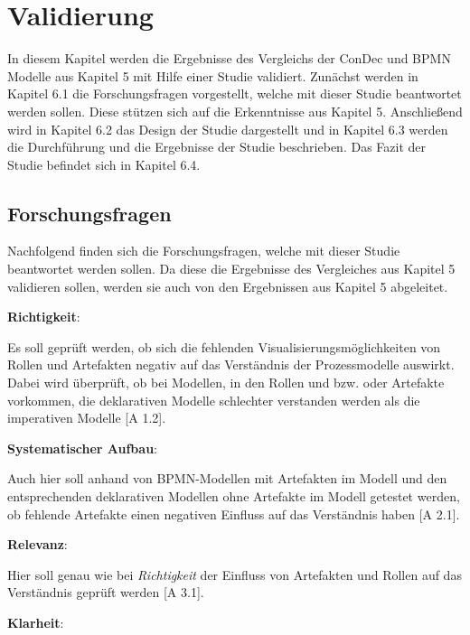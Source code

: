 \chapter{Validierung}\label{sec:chapter7}

In diesem Kapitel werden die Ergebnisse des Vergleichs der ConDec und BPMN Modelle aus Kapitel 5 mit Hilfe einer Studie validiert. Zunächst werden in Kapitel 6.1 die Forschungsfragen vorgestellt, welche mit dieser Studie beantwortet werden sollen. Diese stützen sich auf die Erkenntnisse aus Kapitel 5. Anschließend wird in Kapitel 6.2 das Design der Studie dargestellt und in Kapitel 6.3 werden die Durchführung und die Ergebnisse der Studie beschrieben. Das Fazit der Studie befindet sich in Kapitel 6.4. \newline


\section{Forschungsfragen}
Nachfolgend finden sich die Forschungsfragen, welche mit dieser Studie beantwortet werden sollen. Da diese die Ergebnisse des Vergleiches aus Kapitel 5 validieren sollen, werden sie auch von den Ergebnissen aus Kapitel 5 abgeleitet.\newline

\textbf{Richtigkeit}: 

Es soll geprüft werden, ob sich die fehlenden Visualisierungsmöglichkeiten von Rollen und Artefakten negativ auf das Verständnis der Prozessmodelle auswirkt. Dabei wird überprüft, ob bei Modellen, in den Rollen und bzw. oder Artefakte vorkommen, die deklarativen Modelle schlechter verstanden werden als die imperativen Modelle [A 1.2].\newline

\textbf{Systematischer Aufbau}: 

Auch hier soll anhand von BPMN-Modellen mit Artefakten im Modell und den entsprechenden deklarativen Modellen ohne Artefakte im Modell getestet werden, ob fehlende Artefakte einen negativen Einfluss auf das Verständnis haben [A 2.1].\newline

\textbf{Relevanz}: 

Hier soll genau wie bei \textit{Richtigkeit} der Einfluss von Artefakten und Rollen auf das Verständnis geprüft werden [A 3.1]. \newline

\textbf{Klarheit}: 

